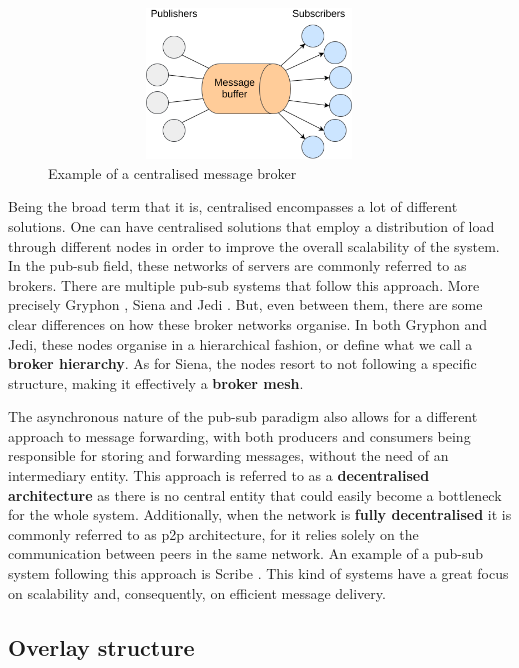 \begin{figure}[hb!]
  \centering
  \includegraphics[max height=4cm,max width=0.95\textwidth]{img/centralised-topology.png}
  \caption{Example of a centralised message broker}
  \label{fig:centralised-topology}
\end{figure}

Being the broad term that it is, centralised encompasses a lot of different solutions.
One can have centralised solutions that employ a distribution of load through
different nodes in order to improve the overall scalability of the system. In the pub-sub field, these networks
of servers are commonly referred to as brokers. There are multiple pub-sub systems
that follow this approach. More precisely Gryphon \cite{Strom1998}, Siena \cite{Carzaniga2003}
and Jedi \cite{Cugola2001}. But, even between them, there are some clear differences
on how these broker networks organise. In both Gryphon and Jedi, these nodes organise in
a hierarchical fashion, or define what we call a \textbf{broker hierarchy}. As for Siena,
the nodes resort to not following a specific structure, making it effectively a \textbf{broker mesh}.

The asynchronous nature of the pub-sub paradigm also allows for a different
approach to message forwarding, with both producers and consumers being
responsible for storing and forwarding messages, without the need of an
intermediary entity. This approach is referred to as a \textbf{decentralised
architecture} as there is no central entity that could easily become a
bottleneck for the whole system. Additionally, when the network is
\textbf{fully decentralised} it is commonly referred to as \acrfull{p2p}
architecture, for it relies solely on the communication between peers in the
same network.  An example of a pub-sub system following this approach is Scribe
\cite{Castro2002}.  This kind of systems have a great focus on scalability and,
consequently, on efficient message delivery.

\subsection{Overlay structure}\label{overlay-structure}

